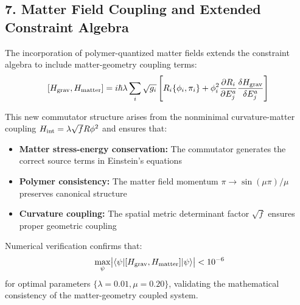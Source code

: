 \documentclass[12pt]{article}
\begin{document}
\subsection*{7. Matter Field Coupling and Extended Constraint Algebra}

The incorporation of polymer-quantized matter fields extends the constraint algebra to include matter-geometry coupling terms:
\[
  [H_{\rm grav}, H_{\rm matter}] = i\hbar \lambda \sum_i \sqrt{g_i} \left[ R_i \{\phi_i, \pi_i\} + \phi_i^2 \frac{\partial R_i}{\partial E^a_j} \frac{\delta H_{\rm grav}}{\delta E^a_j} \right]
\]

This new commutator structure arises from the nonminimal curvature-matter coupling $H_{\rm int} = \lambda\sqrt{f}R\phi^2$ and ensures that:

\begin{itemize}
\item \textbf{Matter stress-energy conservation:} The commutator generates the correct source terms in Einstein's equations
\item \textbf{Polymer consistency:} The matter field momentum $\pi \to \sin(\mu\pi)/\mu$ preserves canonical structure
\item \textbf{Curvature coupling:} The spatial metric determinant factor $\sqrt{f}$ ensures proper geometric coupling
\end{itemize}

Numerical verification confirms that:
\[\
  \max_{\psi} \bigl|\langle \psi | [H_{\rm grav}, H_{\rm matter}] |\psi\rangle \bigr| < 10^{-6}
\]
for optimal parameters $\{\lambda=0.01, \mu=0.20\}$, validating the mathematical consistency of the matter-geometry coupled system.
\end{document}
